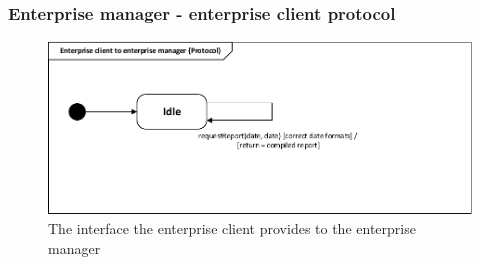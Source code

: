 \subsubsection*{Enterprise manager - enterprise client protocol}
\begin{figure}[H]
\centering
\includegraphics[width=0.7\linewidth]{img/behaviour_state_machines/protocol_state_machines/protocol_state_machine_enterprise_client_enterprise_manager}
\caption{The interface the enterprise client provides to the enterprise manager}
\label{fig:protocol_state_machine_enterprise_client_enterprise_manager}
\end{figure}